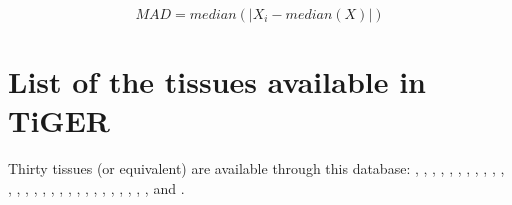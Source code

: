 \begin{equation}\label{eq:mad}
    \tag{M.A.D.}
MAD = median(|X_{i}-median(X)|)
\end{equation}


\section{List of the tissues available in TiGER}\label{sec:supplTiger}

Thirty tissues (or equivalent) are available through this database:
, , , ,
, , , ,
, , , ,
, , , ,
, , ,
, , ,
, , ,
, , ,  and .

